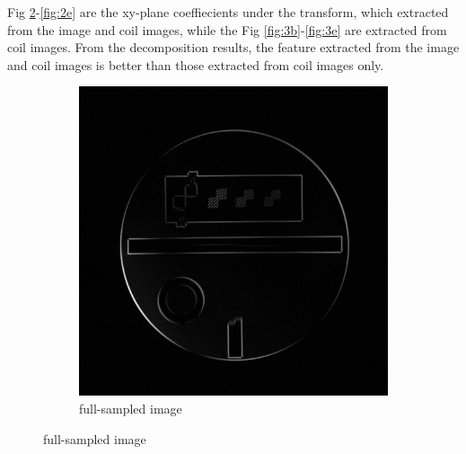 \documentclass[UTF8]{article}
\begin{document}
\par Fig \ref{fig:2a}-\ref{fig:2e} are the xy-plane coeffiecients under the transform, which extracted from the image and coil images, while the Fig \ref{fig:3b}-\ref{fig:3e} are extracted from coil images. From the decomposition results, the feature extracted from the image and coil images is better than those extracted from coil images only. 
\begin{figure}[ht]
	\centering
	\begin{subfigure}[h]{0.2\textwidth}
		\centering
		\includegraphics[scale=0.15]{./image/1c.jpg}
		\caption{full-sampled image}
		\label{fig:2a}
	\end{subfigure}


\end{figure}
\end{document}
